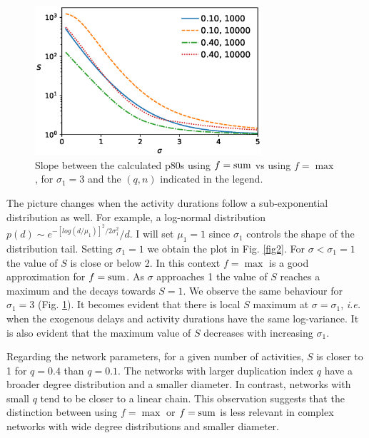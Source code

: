 \documentclass[reprint,aps,prl,amsmath,amssymb,superscriptaddress,showpacs]{revtex4-1}
\begin{document}
\begin{figure}[t]
\includegraphics[width=3.3in]{maxsum.scheduling.dupsplit.arc_distribution_lognormal.arc_sigma_3.eps}
\caption{Slope between the calculated p80s using $f={\rm sum}$ vs using $f={\max}$, for $\sigma_1=3$ and the $(q,n)$ indicated in the legend. }
\label{fig3}
\end{figure}

The picture changes when the activity durations follow a sub-exponential distribution as well. For example, a log-normal distribution $p(d)\sim e^{-[log(d/\mu_1)]^2/2\sigma_1^2}/d$. I will set $\mu_1=1$ since $\sigma_1$ controls the shape of the distribution tail. Setting $\sigma_1=1$ we obtain the plot in Fig. \ref{fig2}. For $\sigma<\sigma_1=1$ the value of $S$ is close or below 2. In this context $f={\max}$ is a good approximation for $f={\rm sum}$. As $\sigma$ approaches 1 the value of $S$ reaches a maximum and the decays towards $S=1$. We observe the same behaviour for $\sigma_1=3$ (Fig. \ref{fig3}). It becomes evident that there is local $S$ maximum at $\sigma=\sigma_1$, {\em i.e.} when the exogenous delays and activity durations have the same log-variance. It is also evident that the maximum value of $S$ decreases with increasing $\sigma_1$.

Regarding the network parameters, for a given number of activities, $S$ is closer to 1 for $q=0.4$ than $q=0.1$. The networks with larger duplication index $q$ have a broader degree distribution and a smaller diameter. In contrast, networks with small $q$ tend to be closer to a linear chain. This observation suggests that the distinction between using $f={\max}$ or $f={\rm sum}$ is less relevant in complex networks with wide degree distributions and smaller diameter.  
\end{document}
